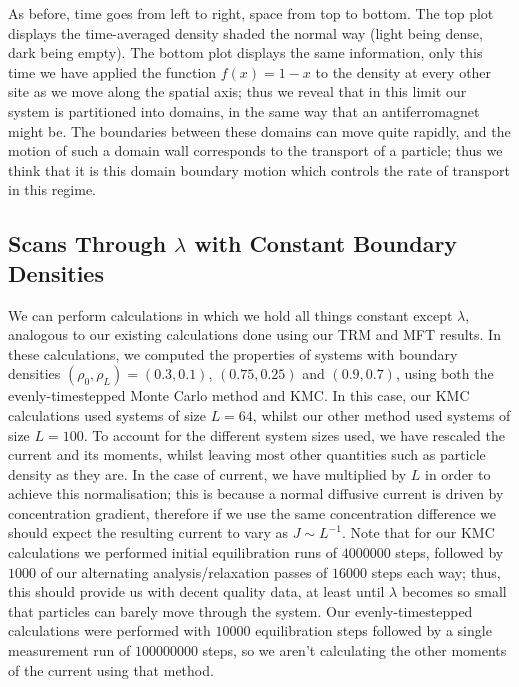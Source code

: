 \begin{figure}
\begin{center}
\begin{tabular}{c}
\end{tabular}
\end{center}
 \end{figure}
 
As before, time goes from left to right, space from top to bottom. 
The top plot displays the time-averaged density shaded the normal way (light being dense, dark being empty).
The bottom plot displays the same information, only this time we have applied the function $f(x) = 1-x$
to the density at every other site as we move along the spatial axis; thus we reveal that in this limit
our system is partitioned into domains, in the same way that an antiferromagnet might be. The boundaries
between these domains can move quite rapidly, and the motion of such a domain wall corresponds to the
transport of a particle; thus we think that it is this domain boundary motion which controls the rate
of transport in this regime.
 
 
\subsection{Scans Through $\lambda$ with Constant Boundary Densities} \label{sec:lambdaScans}
We can perform calculations in which we hold all things constant except $\lambda$, analogous to our 
existing calculations done using our TRM and MFT results. In these calculations, we computed the properties of systems with boundary densities $(\rho_0 , \rho_L )=(0.3, 0.1)$, $(0.75, 0.25)$ and 
$(0.9, 0.7)$, using both the evenly-timestepped Monte Carlo method and KMC. In this case, our KMC calculations used systems of size $L = 64$, whilst our other method used systems of size $L=100$.
To account for the different system sizes used, we have rescaled the current and its moments, whilst
leaving most other quantities such as particle density as they are. In the case of current, we have
multiplied by $L$ in order to achieve this normalisation; this is because a normal diffusive current is
driven by concentration gradient, therefore if we use the same concentration difference we should expect 
the resulting current to vary as $J \sim L^{-1}$. Note that for our KMC calculations we performed initial
equilibration runs of $4000000$ steps, followed by $1000$ of our alternating analysis/relaxation passes
of $16000$ steps each way; thus, this should provide us with decent quality data, at least until $\lambda$
becomes so small that particles can barely move through the system. Our evenly-timestepped calculations
were performed with $10000$ equilibration steps followed by a single measurement run of $100000000$ steps,
so we aren't calculating the other moments of the current using that method.

